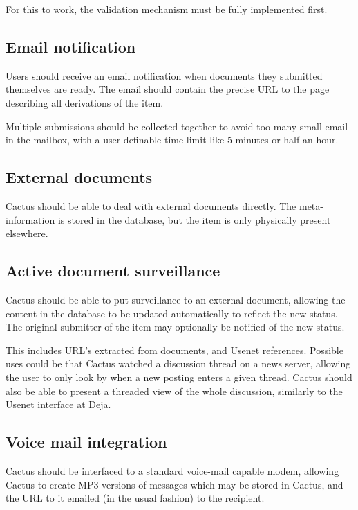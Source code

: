 For this to work, the validation mechanism must be fully implemented first.

\subsection*{Email notification}

Users should receive an email notification when documents they
submitted themselves are ready.  The email should contain the precise
URL to the page describing all derivations of the item.

Multiple submissions should be collected together to avoid too many
small email in the mailbox, with a user definable time limit like 5
minutes or half an hour.


\subsection*{External documents}

Cactus should be able to deal with external documents directly.  The
meta-information is stored in the database, but the item is only
physically present elsewhere.

\subsection*{Active document surveillance}

Cactus should be able to put surveillance to an external document,
allowing the content in the database to be updated automatically to
reflect the new status.  The original submitter of the item may
optionally be notified of the new status.

This includes URL's extracted from documents, and Usenet references.
Possible uses could be that Cactus watched a discussion thread on a
news server, allowing the user to only look by when a new posting
enters a given thread.   Cactus should also be able to present a
threaded view of the whole discussion, similarly to the Usenet
interface at Deja.



\subsection*{Voice mail integration}

Cactus should be interfaced to a standard voice-mail capable modem,
allowing Cactus to create MP3 versions of messages which may be stored
in Cactus, and the URL to it emailed (in the usual fashion) to the recipient.


